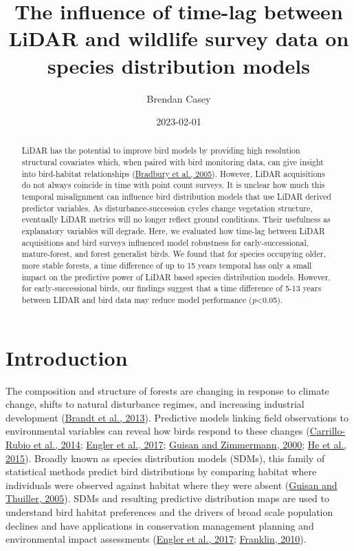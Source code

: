 \documentclass[
  12pt,
]{article}
\title{The influence of time-lag between LiDAR and wildlife survey data on species distribution models}
\author{Brendan Casey}
\date{2023-02-01}
\begin{document}
\maketitle
\begin{abstract}
LiDAR has the potential to improve bird models by providing high resolution structural covariates which, when paired with bird monitoring data, can give insight into bird-habitat relationships (\protect\hyperlink{ref-Bradbury2005}{Bradbury et al., 2005}). However, LiDAR acquisitions do not always coincide in time with point count surveys. It is unclear how much this temporal misalignment can influence bird distribution models that use LiDAR derived predictor variables. As disturbance-succession cycles change vegetation structure, eventually LiDAR metrics will no longer reflect ground conditions. Their usefulness as explanatory variables will degrade. Here, we evaluated how time-lag between LiDAR acquisitions and bird surveys influenced model robustness for early-successional, mature-forest, and forest generalist birds. We found that for species occupying older, more stable forests, a time difference of up to 15 years temporal has only a small impact on the predictive power of LiDAR based species distribution models. However, for early-successional birds, our findings suggest that a time difference of 5-13 years between LIDAR and bird data may reduce model performance (\emph{p}\textless0.05).
\end{abstract}

{
\hypersetup{linkcolor=}
\setcounter{tocdepth}{2}
\tableofcontents
}
\hypertarget{introduction}{%
\section{Introduction}\label{introduction}}

The composition and structure of forests are changing in response to climate change, shifts to natural disturbance regimes, and increasing industrial development (\protect\hyperlink{ref-Brandt2013}{Brandt et al., 2013}). Predictive models linking field observations to environmental variables can reveal how birds respond to these changes (\protect\hyperlink{ref-Carrillo-Rubio2014}{Carrillo-Rubio et al., 2014}; \protect\hyperlink{ref-englerAvianSDMsCurrent2017}{Engler et al., 2017}; \protect\hyperlink{ref-guisanPredictiveHabitatDistribution2000}{Guisan and Zimmermann, 2000}; \protect\hyperlink{ref-He2015}{He et al., 2015}). Broadly known as species distribution models (SDMs), this family of statistical methods predict bird distributions by comparing habitat where individuals were observed against habitat where they were absent (\protect\hyperlink{ref-Guisan2005}{Guisan and Thuiller, 2005}). SDMs and resulting predictive distribution maps are used to understand bird habitat preferences and the drivers of broad scale population declines and have applications in conservation management planning and environmental impact assessments (\protect\hyperlink{ref-englerAvianSDMsCurrent2017}{Engler et al., 2017}; \protect\hyperlink{ref-franklinMappingSpeciesDistributions2010}{Franklin, 2010}).
\end{document}
